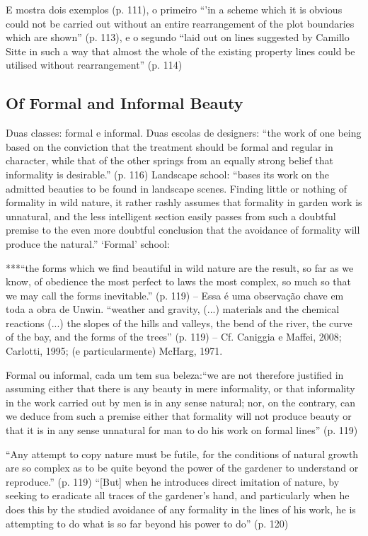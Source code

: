 \documentclass[12pt, a4paper]{book} %
\begin{document}
        E mostra dois exemplos (p. 111), o primeiro ``'in a scheme which it is obvious could not be carried out without an entire rearrangement of the plot boundaries which are shown'' (p. 113), e o segundo ``laid out on lines suggested by Camillo Sitte in such a way that almost the whole of the existing property lines could be utilised without rearrangement'' (p. 114)

        \subsection*{Of Formal and Informal Beauty}

        Duas classes: formal e informal.
        Duas escolas de designers: ``the work of one being based on the conviction that the treatment should be formal and regular in character, while that of the other springs from an equally strong belief that informality is desirable.'' (p. 116)
        Landscape school: ``bases its work on the admitted beauties to be found in landscape scenes. Finding little or nothing of formality in wild nature, it rather rashly assumes that formality in garden work is unnatural, and the less intelligent section easily passes from such a doubtful premise to the even more doubtful conclusion that the avoidance of formality will produce the natural.''
        `Formal' school:

        ***``the forms which we find beautiful in wild nature are the result, so far as we know, of obedience the most perfect to laws the most complex, so much so that we may call the forms inevitable.'' (p. 119) – Essa é uma observação chave em toda a obra de Unwin.
        ``weather and gravity, (...) materials and the chemical reactions (...) the slopes of the hills and valleys, the bend of the river, the curve of the bay, and the forms of the trees'' (p. 119) – Cf. Caniggia e Maffei, 2008; Carlotti, 1995; (e particularmente) McHarg, 1971.

        Formal ou informal, cada um tem sua beleza:``we are not therefore justified in assuming either that there is any beauty in mere informality, or that informality in the work carried out by men is in any sense natural; nor, on the contrary, can we deduce from such a premise either that formality will not produce beauty or that it is in any sense unnatural for man to do his work on formal lines'' (p. 119)

        ``Any attempt to copy nature must be futile, for the conditions of natural growth are so complex as to be quite beyond the power of the gardener to understand or reproduce.'' (p. 119)
        ``[But] when he introduces direct imitation of nature, by seeking to eradicate all traces of the gardener's hand, and particularly when he does this by the studied avoidance of any formality in the lines of his work, he is attempting to do what is so far beyond his power to do'' (p. 120)
\end{document}
